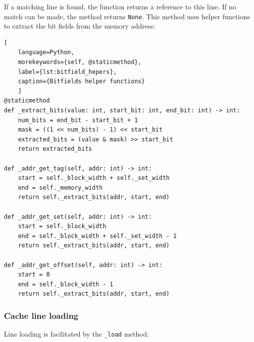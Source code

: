 \noindent If a matching line is found, the function returns a reference to this line. If no match can be made, the method returns \texttt{None}. This method uses helper functions
to extract the bit fields from the memory address:


\begin{center}
\centering
\begin{minipage}{\linewidth}
\begin{lstlisting}[
    language=Python,
	morekeywords={self, @staticmethod},
    label={lst:bitfield_hepers},
    caption={Bitfields helper functions}
    ]
@staticmethod
def _extract_bits(value: int, start_bit: int, end_bit: int) -> int:
    num_bits = end_bit - start_bit + 1
    mask = ((1 << num_bits) - 1) << start_bit
    extracted_bits = (value & mask) >> start_bit
    return extracted_bits

def _addr_get_tag(self, addr: int) -> int:
    start = self._block_width + self._set_width
    end = self._memory_width
    return self._extract_bits(addr, start, end)

def _addr_get_set(self, addr: int) -> int:
    start = self._block_width
    end = self._block_width + self._set_width - 1
    return self._extract_bits(addr, start, end)

def _addr_get_offset(self, addr: int) -> int:
    start = 0
    end = self._block_width - 1
    return self._extract_bits(addr, start, end)
\end{lstlisting}
\end{minipage}
\end{center}

\subsubsection*{Cache line loading}
\noindent Line loading is facilitated by the \texttt{\_load} method:

